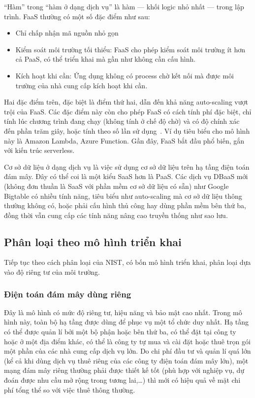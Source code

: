 \documentclass{article}
\begin{document}
``Hàm'' trong ``hàm ở dạng dịch vụ'' là hàm --- khối logic nhỏ nhất --- trong
lập trình. FaaS thường có một số đặc điểm như sau:

\begin{itemize}
    \item Chỉ chấp nhận mã nguồn nhỏ gọn
    \item Kiểm soát môi trường tối thiểu: FaaS cho phép kiểm soát môi trường ít
        hơn cả PaaS, có thể triển khai mà gần như không cần cấu hình.
    \item Kích hoạt khi cần: Ứng dụng không có process chờ kết nối mà được môi
        trường của nhà cung cấp kích hoạt khi cần.
\end{itemize}

Hai đặc điểm trên, đặc biệt là điểm thứ hai, dẫn đến khả năng auto-scaling vượt
trội của FaaS. Các đặc điểm này còn cho phép FaaS có cách tính phí đặc biệt, chỉ
tính lúc chương trình đang chạy (không tính ở chế độ chờ) và có độ chính xác đến
phần trăm giây, hoặc tính theo số lần sử dụng~\cite{CFPvF}. Ví dụ tiêu biểu cho
mô hình này là Amazon Lambda, Azure Function. Gần đây, FaaS bắt đầu phổ biến,
gắn với kiến trúc serverless.

Cơ sở dữ liệu ở dạng dịch vụ là việc sử dụng cơ sở dữ liệu trên hạ tầng điện
toán đám mây. Đây có thể coi là một kiểu SaaS hơn là PaaS. Các dịch vụ DBaaS mới
(không đơn thuần là SaaS với phần mềm cơ sở dữ liệu có sẵn) như Google Bigtable
có nhiều tính năng, tiêu biểu như auto-scaling mà cơ sở dữ liệu thông thường
không có, hoặc phải cấu hình thủ công hay dùng phần mềm bên thứ ba, đồng thời
vẫn cung cấp các tính năng nâng cao truyền thống như sao lưu.

\subsection{Phân loại theo mô hình triển khai}

Tiếp tục theo cách phân loại của NIST, có bốn mô hình triển khai, phân loại dựa
vào độ riêng tư của môi trường.

\subsubsection{Điện toán đám mây dùng riêng}

Đây là mô hình có mức độ riêng tư, hiệu năng và bảo mật cao nhất. Trong mô hình
này, toàn bộ hạ tầng được dùng để phục vụ một tổ chức duy nhất. Hạ tầng có thể
được quản lí bởi một bộ phận hoặc bên thứ ba, có thể đặt tại công ty hoặc ở một
địa điểm khác, có thể là công ty tự mua và cài đặt hoặc thuê trọn gói một phần
của các nhà cung cấp dịch vụ lớn. Do chi phí đầu tư và quản lí quá lớn (kể cả
khi dùng dịch vụ thuê riêng của các công ty điện toán đám mây lớn), một mạng đám
mây riêng thường phải được thiết kế tốt (phù hợp với nghiệp vụ, dự đoán được nhu
cầu mở rộng trong tương lai,\ldots) thì mới có hiệu quả về mặt chi phí tổng thể
so với việc thuê thông thường.
\end{document}
